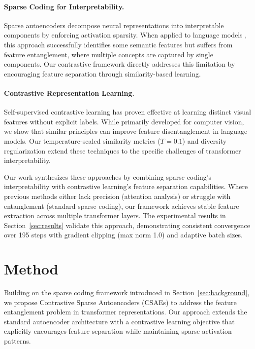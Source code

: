 \documentclass{article} %
\begin{document}
\paragraph{Sparse Coding for Interpretability.} Sparse autoencoders \cite{goodfellow2016deep} decompose neural representations into interpretable components by enforcing activation sparsity. When applied to language models \cite{radford2019language}, this approach successfully identifies some semantic features but suffers from feature entanglement, where multiple concepts are captured by single components. Our contrastive framework directly addresses this limitation by encouraging feature separation through similarity-based learning.

\paragraph{Contrastive Representation Learning.} Self-supervised contrastive learning \cite{Chen2020ASF} has proven effective at learning distinct visual features without explicit labels. While primarily developed for computer vision, we show that similar principles can improve feature disentanglement in language models. Our temperature-scaled similarity metrics ($T=0.1$) and diversity regularization extend these techniques to the specific challenges of transformer interpretability.

Our work synthesizes these approaches by combining sparse coding's interpretability with contrastive learning's feature separation capabilities. Where previous methods either lack precision (attention analysis) or struggle with entanglement (standard sparse coding), our framework achieves stable feature extraction across multiple transformer layers. The experimental results in Section~\ref{sec:results} validate this approach, demonstrating consistent convergence over 195 steps with gradient clipping (max norm 1.0) and adaptive batch sizes.

\section{Method}
\label{sec:method}

Building on the sparse coding framework introduced in Section~\ref{sec:background}, we propose Contrastive Sparse Autoencoders (CSAEs) to address the feature entanglement problem in transformer representations. Our approach extends the standard autoencoder architecture with a contrastive learning objective that explicitly encourages feature separation while maintaining sparse activation patterns.
\end{document}
